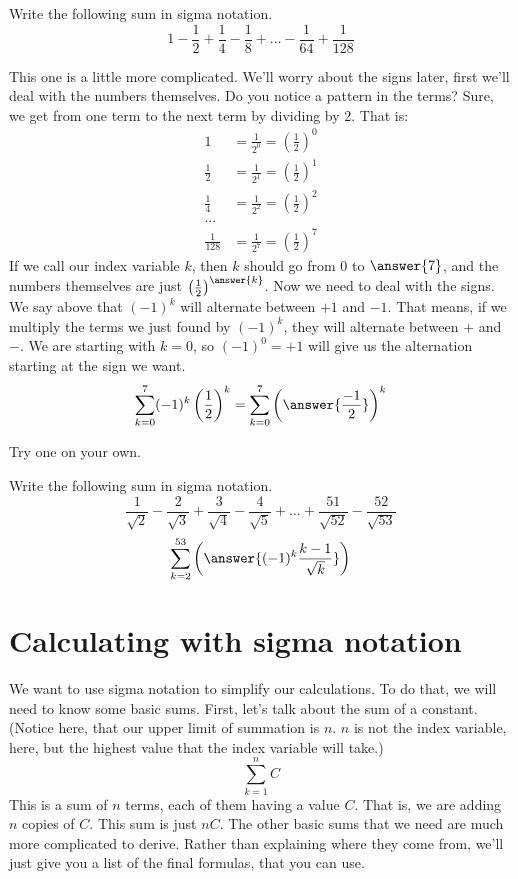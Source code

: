 \documentclass{ximera}
\begin{document}
\begin{example}
	Write the following sum in sigma notation.
	\[ 1 - \frac{1}{2} + \frac{1}{4} - \frac{1}{8} + \ldots - \frac{1}{64} + \frac{1}{128}  \]
	\begin{explanation}
		This one is a little more complicated.  We'll worry about the signs later, first we'll deal with the numbers themselves.  Do you notice a pattern in the terms?
		Sure, we get from one term to the next term by dividing by 2.  That is:
		\begin{align*}
			1 &= \frac{1}{2^0} = \left(\frac{1}{2}\right)^0\\
			\frac{1}{2} &= \frac{1}{2^1} = \left(\frac{1}{2}\right)^{1}\\
			\frac{1}{4} &= \frac{1}{2^2} = \left(\frac{1}{2}\right)^{2}\\
				 ...  \\
			 \frac{1}{128} &= \frac{1}{2^7} = \left(\frac{1}{2}\right)^{7}
		\end{align*}
		If we call our index variable $k$, then $k$ should go from $0$ to $\answer{7}$, and the numbers themselves are just $\left(\frac{1}{2}\right)^{\answer{k}}$.  Now we need to deal with the signs.
		We say above that $(-1)^k$ will alternate between $+1$ and $-1$.  That means, if we multiply the terms we just found by $(-1)^k$, they will alternate between $+$ and $-$.  
		We are starting with $k=0$, so $(-1)^0 = +1$ will give us the alternation starting at the sign we want.
		\[ \sum_{k=0}^{7} (-1)^k \left(\frac{1}{2}\right)^{k} = \sum_{k=0}^7 \left( \answer{\frac{-1}{2}} \right)^k \]
	\end{explanation}
\end{example}
  
 
Try one on your own.
\begin{example}
 	Write the following sum in sigma notation.
 	\[ \frac{1}{\sqrt{2}} - \frac{2}{\sqrt{3}} + \frac{3}{\sqrt{4}} - \frac{4}{\sqrt{5}}+ \ldots + \frac{51}{\sqrt{52}} - \frac{52}{\sqrt{53}} \]
	\[ \sum_{k=2}^{53} \left(  \answer{(-1)^k\frac{k-1}{\sqrt{k}} } \right) \]

\end{example}
   

 
 \section{Calculating with sigma notation}
 We want to use sigma notation to simplify our calculations.  To do that, we will need to know some basic sums.  
 First, let's talk about the sum of a constant.  (Notice here, that our upper limit of summation is $n$.  $n$ is not the index 
 variable, here, but the highest value that the index variable will take.)
 \[ \sum_{k=1}^n C \] 
 This is a sum of $n$ terms, each of them having a value $C$.  That is, we are adding $n$ copies of $C$.  This sum is just $nC$.
 The other basic sums that we need are much more complicated to derive.  Rather than explaining where they come from, we'll just give you
 a list of the final formulas, that you can use.
 
\end{document}
